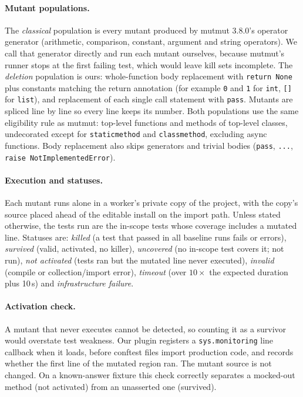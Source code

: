 \paragraph{Mutant populations.} The \emph{classical} population is every mutant produced by mutmut 3.8.0's operator generator (arithmetic, comparison, constant, argument and string operators). We call that generator directly and run each mutant ourselves, because mutmut's runner stops at the first failing test, which would leave kill sets incomplete. The \emph{deletion} population is ours: whole-function body replacement with \texttt{return None} plus constants matching the return annotation (for example \texttt{0} and \texttt{1} for \texttt{int}, \texttt{[]} for \texttt{list}), and replacement of each single call statement with \texttt{pass}. Mutants are spliced line by line so every line keeps its number. Both populations use the same eligibility rule as mutmut: top-level functions and methods of top-level classes, undecorated except for \texttt{staticmethod} and \texttt{classmethod}, excluding async functions. Body replacement also skips generators and trivial bodies (\texttt{pass}, \texttt{...}, \texttt{raise NotImplementedError}).

\paragraph{Execution and statuses.} Each mutant runs alone in a worker's private copy of the project, with the copy's source placed ahead of the editable install on the import path. Unless stated otherwise, the tests run are the in-scope tests whose coverage includes a mutated line. Statuses are:
\emph{killed} (a test that passed in all baseline runs fails or errors),
\emph{survived} (valid, activated, no killer),
\emph{uncovered} (no in-scope test covers it; not run),
\emph{not activated} (tests ran but the mutated line never executed),
\emph{invalid} (compile or collection/import error),
\emph{timeout} (over $10\times$ the expected duration plus 10\,s) and
\emph{infrastructure failure}.

\paragraph{Activation check.} A mutant that never executes cannot be detected, so counting it as a survivor would overstate test weakness. Our plugin registers a \texttt{sys.monitoring} line callback when it loads, before conftest files import production code, and records whether the first line of the mutated region ran. The mutant source is not changed. On a known-answer fixture this check correctly separates a mocked-out method (not activated) from an unasserted one (survived).

